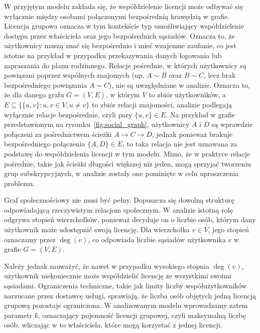 W przyjętym modelu zakłada się, że współdzielenie licencji może odbywać się wyłącznie między osobami połączonymi bezpośrednią krawędzią w grafie. Licencja grupowa oznacza w tym kontekście typ umożliwiający współdzielenie dostępu przez właściciela oraz jego bezpośrednich sąsiadów. Oznacza to, że użytkownicy muszą znać się bezpośrednio i mieć wzajemne zaufanie, co jest istotne na przykład w przypadku przekazywania danych logowania lub zapraszania do planu rodzinnego. Relacje pośrednie, w których użytkownicy są powiązani poprzez wspólnych znajomych (np. \( A \sim B \) oraz \( B \sim C \), lecz brak bezpośredniego powiązania \( A \sim C \)), nie są uwzględniane w analizie. Oznacza to, że dla danego grafu \( G = (V, E) \),
w którym \( V \) to zbiór użytkowników, a \( E \subseteq \{ \{u,v\} : u,v \in V, u \neq v \} \) to zbiór relacji znajomości, analizie podlegają wyłącznie relacje bezpośrednie, czyli pary \( \{u, v\} \in E \).
Na przykład w grafie przedstawionym na rysunku~\ref{fig:social_graph}, użytkownicy \( A \) i \( D \) są wprawdzie połączeni za pośrednictwem ścieżki \( A \rightarrow C \rightarrow D \), jednak ponieważ brakuje bezpośredniego połączenia \( \{A,D\} \in E \), to taka relacja nie jest uznawana za podstawę do współdzielenia licencji w tym modelu.
Mimo, że w praktyce relacje pośrednie, takie jak ścieżki długości większej niż jeden, mogą sprzyjać tworzeniu grup subskrypcyjnych, w analizie zostały one pominięte w celu uproszczenia problemu.

Graf społecznościowy nie musi być pełny. Dopuszcza się dowolną strukturę odpowiadającą rzeczywistym relacjom społecznym. W analizie istotną rolę odgrywa stopień wierzchołków, ponieważ decyduje on o liczbie osób, którym dany użytkownik może udostępnić swoją licencję. Dla wierzchołka \( v \in V \), jego stopień oznaczamy przez \( \deg(v) \), co odpowiada liczbie sąsiadów użytkownika \( v \) w grafie \( G = (V, E) \).

Należy jednak zauważyć, że nawet w przypadku wysokiego stopnia \( \deg(v) \), użytkownik niekoniecznie może współdzielić licencję ze wszystkimi swoimi sąsiadami. Ograniczenia techniczne, takie jak limity liczby współużytkowników narzucane przez dostawcę usługi, sprawiają, że liczba osób objętych jedną licencją grupową pozostaje ograniczona. W analizowanym modelu wprowadzamy zatem parametr \( k \), oznaczający pojemność licencji grupowej, czyli maksymalną liczbę osób, wliczając w to właściciela, które mogą korzystać z jednej licencji.



